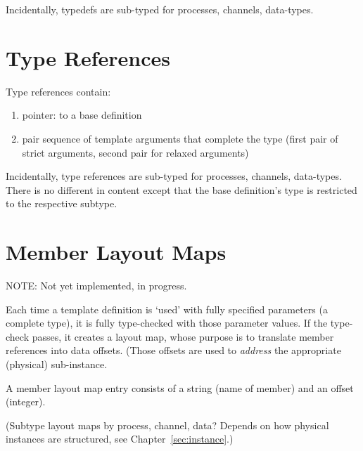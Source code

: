 Incidentally, typedefs are sub-typed for processes, channels, data-types.  

\section{Type References}
\label{sec:definition:typeref}

Type references contain:

\begin{enumerate}
\item pointer: to a base definition
\item pair sequence of template arguments that complete the type
	(first pair of strict arguments, second pair for relaxed arguments)
\end{enumerate}

Incidentally, type references are sub-typed for 
processes, channels, data-types.  
There is no different in content except that the base definition's
type is restricted to the respective subtype.  

\section{Member Layout Maps}
\label{sec:definition:layout}

NOTE: Not yet implemented, in progress.  

Each time a template definition is `used' with fully specified parameters 
(a complete type), it is fully type-checked with those parameter values.  
If the type-check passes, it creates a layout map, whose purpose is
to translate member references into data offsets.  
(Those offsets are used to \emph{address} the 
appropriate (physical) sub-instance.  

A member layout map entry consists of a string (name of member)
and an offset (integer).  

(Subtype layout maps by process, channel, data?
Depends on how physical instances are structured, 
see Chapter~\ref{sec:instance}.)



